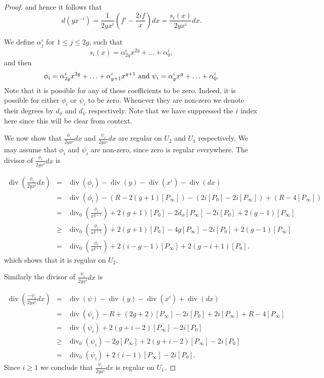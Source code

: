 \documentclass[draft, 11pt]{article} %
\theoremstyle{plain}
\theoremstyle{remark}
\DeclareMathOperator{\di}{div}
\begin{document}
\begin{proof}
and hence it follows that 
\begin{equation*}
d \left( yx^{-i} \right) = \frac{1}{2yx^{i}}\left( f' - \frac{2if}{x} \right) dx = \frac{s_i(x)}{2yx^i}dx.
\end{equation*}

We define $\alpha^i_j$ for $1\leq j \leq 2g$, such that
\[
	s_i(x) = \alpha^i_{2g}x^{2g} + \ldots + \alpha^i_0, 
\]
and then 
\[
\phi_i = \alpha^i_{2g}x^{2g} + \ldots + \alpha^i_{g+1}x^{g+1} \ {\rm and } \ \psi_i = \alpha^i_gx^g + \ldots + \alpha^i_0.
\]
Note that it is possible for any of these coefficients to be zero. Indeed, it is possible for either $\phi_i$ or $\psi_i$ to be zero.
Whenever they are non-zero we denote their degrees by $d_\phi$ and $d_\psi$ respectively.
Note that we have suppressed the $i$ index here since this will be clear from context.


We now show that $\frac{\phi_i}{2yx^i}dx$ and $\frac{\psi_i}{2yx^i}dx$ are regular on $U_2$ and $U_1$ respectively.
We may assume that $\phi_i$ and $\psi_i$ are non-zero, since zero is regular everywhere.
The divisor of $\frac{\phi_i}{2yx^i}dx$ is

\begin{eqnarray*}
\di\left( \frac{\phi_i}{2yx^i}dx \right) & = & \di(\phi_i) -\di(y) - \di(x^i) - \di (dx) \\
& = & \di(\phi_i) - ( R - 2(g+1)[P_\infty]) - (2i[P_0] - 2i[P_\infty]) + (R - 4[P_\infty]) \\
& = & \di_0\left( \frac{\phi_i}{x^{g+1}}\right) + 2(g+1)[P_0] - 2d_\phi[P_\infty] - 2i[P_0] + 2(g-1)[P_\infty] \\
& \geq & \di_0\left( \frac{\phi_i}{x^{g+1}}\right) + 2(g+1)[P_0] - 4g[P_\infty] - 2i[P_0] + 2(g-1)[P_\infty] \\
& = & \di_0\left( \frac{\phi_i}{x^{g+1}} \right) + 2(i-g-1)[P_\infty] + 2(g-i+1)[P_0].
\end{eqnarray*}
which shows that it is regular on $U_2$.

Similarly the divisor of $\frac{\psi_i}{2yx^i}dx$ is 

\begin{eqnarray*}
\di \left( \frac{-\psi_i}{2yx^i}dx\right) & = & \di(\psi) - \di(y) - \di(x^i) + \di (dx) \\
& = & \di (\psi_i ) -R + (2g+2)[P_\infty] - 2i[P_0] + 2i[P_\infty] + R -4[P_\infty] \\
& =  & \di(\psi_i) + 2(g+i-2)[P_\infty] -2i[P_0] \\
& \geq & \di_0(\psi_i) - 2g[P_\infty] + 2(g+i-2)[P_\infty] -2i[P_0] \\
& = & \di_0(\psi_i) + 2(i-1)[P_\infty] - 2i[P_0].
\end{eqnarray*}
Since $i\geq 1$ we conclude that $\frac{\psi_i}{2yx^i}dx$ is regular on $U_1$.


\end{proof}
\end{document}

